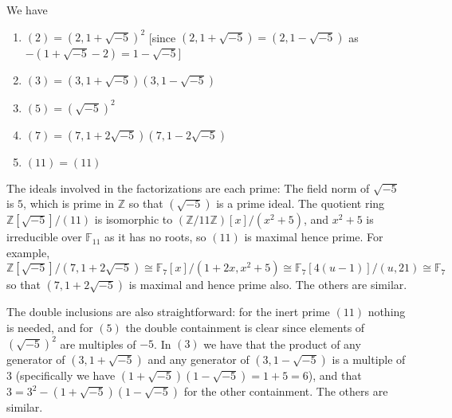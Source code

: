 \documentclass[11pt]{article}
\begin{document}
\begin{enumerate}
\begin{enumerate}
        We have \begin{enumerate}
            \item $(2) = (2,1+\sqrt{-5})^2$ [since $(2,1+\sqrt{-5}) = (2,1-\sqrt{-5})$ as $-(1+\sqrt{-5}-2)=1-\sqrt{-5}$]
            \item $(3) = (3,1+\sqrt{-5})(3,1-\sqrt{-5})$
            \item $(5)=(\sqrt{-5})^2$
            \item $(7) = (7,1+2\sqrt{-5})(7,1-2\sqrt{-5})$
            \item $(11) = (11)$
        \end{enumerate}
        The ideals involved in the factorizations are each prime: The field norm of $\sqrt{-5}$ is $5$, which is prime in $\mathbb{Z}$ so that $(\sqrt{-5})$ is a prime ideal. The quotient ring $\mathbb{Z}[\sqrt{-5}]/(11)$ is isomorphic to $(\mathbb{Z}/11\mathbb{Z})[x]/(x^2+5)$, and $x^2+5$ is irreducible over $\mathbb{F}_{11}$ as it has no roots, so $(11)$ is maximal hence prime. For example, $\mathbb{Z}[\sqrt{-5}]/(7,1+2\sqrt{-5})\cong \mathbb{F}_7[x]/(1+2x,x^2+5)\cong \mathbb{F}_7[4(u-1)]/(u,21)\cong \mathbb{F}_7$ so that $(7,1+2\sqrt{-5})$ is maximal and hence prime also. The others are similar.

        The double inclusions are also straightforward: for the inert prime $(11)$ nothing is needed, and for $(5)$ the double containment is clear since elements of $(\sqrt{-5})^2$ are multiples of $-5$. In $(3)$ we have that the product of any generator of $(3,1+\sqrt{-5})$ and any generator of $(3,1-\sqrt{-5})$ is a multiple of $3$ (specifically we have $(1+\sqrt{-5})(1-\sqrt{-5}) = 1+5=6$), and that $3=3^2-(1+\sqrt{-5})(1-\sqrt{-5})$ for the other containment. The others are similar.
    \end{enumerate}
\end{enumerate}
\end{document}
